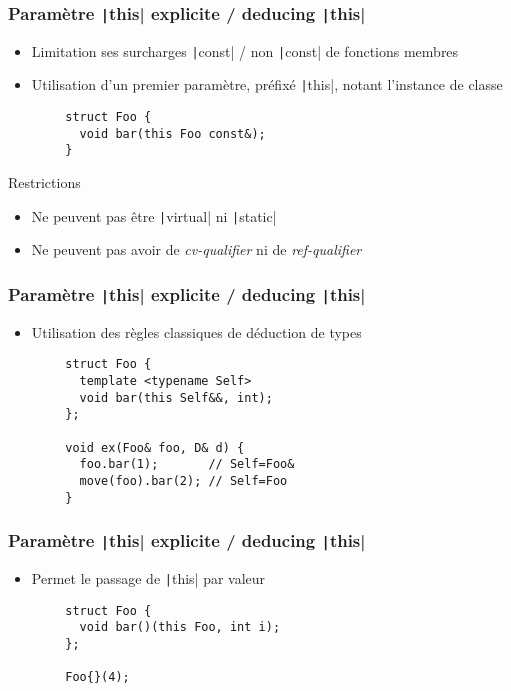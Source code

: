 \documentclass[C++.tex]{subfiles}
\begin{document}
\begin{frame}[fragile]
	\frametitle{Paramètre \texttt|this| explicite / deducing \texttt|this|}
	\begin{itemize}
		\item Limitation ses surcharges \texttt|const| / non \texttt|const| de fonctions membres
		\item Utilisation d'un premier paramètre, préfixé \texttt|this|, notant l'instance de classe
	\end{itemize}

	\begin{verbatim}
		struct Foo {
		  void bar(this Foo const&);
		}
	\end{verbatim}

	\begin{alertblock}{Restrictions}
		\begin{itemize}
			\item Ne peuvent pas être \texttt|virtual| ni \texttt|static|
			\item Ne peuvent pas avoir de \textit{cv-qualifier} ni de \textit{ref-qualifier}
		\end{itemize}
	\end{alertblock}
\end{frame}

\begin{frame}[fragile]
	\frametitle{Paramètre \texttt|this| explicite / deducing \texttt|this|}
	\begin{itemize}
		\item Utilisation des règles classiques de déduction de types 
	\end{itemize}

	\begin{verbatim}
		struct Foo {
		  template <typename Self>
		  void bar(this Self&&, int);
		};

		void ex(Foo& foo, D& d) {
		  foo.bar(1);       // Self=Foo&
		  move(foo).bar(2); // Self=Foo
		}
	\end{verbatim}
\end{frame}

\begin{frame}[fragile]
	\frametitle{Paramètre \texttt|this| explicite / deducing \texttt|this|}
	\begin{itemize}
		\item Permet le passage de \texttt|this| par valeur
	\end{itemize}

	\begin{verbatim}
		struct Foo {
		  void bar()(this Foo, int i);
		};

		Foo{}(4);
	\end{verbatim}
\end{frame}
\end{document}
